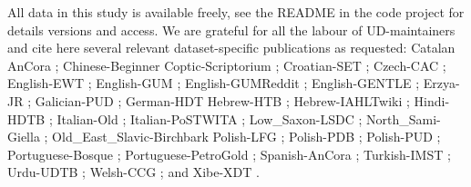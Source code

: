 \documentclass[USenglish]{article}
\begin{document}
All data in this study is available freely, see the README in the code project for details versions and access. 
We are grateful for all the labour of UD-maintainers and cite here several relevant dataset-specific publications as requested: %
    Catalan AnCora \citep{taule_ancora_2008}; 
    Chinese-Beginner %
    Coptic-Scriptorium \citep{zeldes_coptic_2018}; 
    Croatian-SET \citet{agic_universal_2015}; 
    Czech-CAC \citep{hladka_pruvodce_2007, hladka_czech_2008, tesitelova_k_1983}; 
    English-EWT \citep{silveira_gold_2014}; 
    English-GUM \citet{zeldes_gum_2017}; 
    English-GUMReddit \citep{behzad_cross-genre_2020}; 
    English-GENTLE \citep{aoyama_gentle_2023}; 
    Erzya-JR \citep{rueter_towards_2018}; 
    Galician-PUD \citep{sanchez-rodriguez_increasing_2024}; 
    German-HDT
    Hebrew-HTB \citep{tsarfaty_unified_2013, mcdonald_universal_2013}; 
    Hebrew-IAHLTwiki \citep{zeldes_secondwave_2022}; 
    Hindi-HDTB \citep{bhat_hindiurdu_2017, palmer_hindi_2009}; 
    Italian-Old \citep{corbetta_highway_2023, alighieri_commedia_1994}; 
    Italian-PoSTWITA \citep{sanguinetti_postwita-ud_2018, sanguinetti_treebanking_2023, sanguinetti_annotating_2017, bosco_overview_2016}; 
    Low\_Saxon-LSDC \citep{siewert_low_2024}; 
    North\_Sami-Giella \citep{sheyanova_annotation_2017}; 
    Old\_East\_Slavic-Birchbark
     Polish-LFG \citep{patejuk_lexical_2018}; 
     Polish-PDB \citep{wroblewska_extended_2018}; 
     Polish-PUD \citep{wroblewska_extended_2018}; 
     Portuguese-Bosque \citep{rademaker_universal_2017}; 
     Portuguese-PetroGold \citep{de_souza_polishing_2022}; 
     Spanish-AnCora \citep{taule_ancora_2008}; 
     Turkish-IMST \citep{sulubacak_implementing_2018, sulubacak_universal_2016}; 
     Urdu-UDTB \citep{bhat_hindiurdu_2017}; 
     Welsh-CCG \citep{heinecke_development_2019}; 
   and  Xibe-XDT \citep{zhou_universal_2020}.
\end{document}
